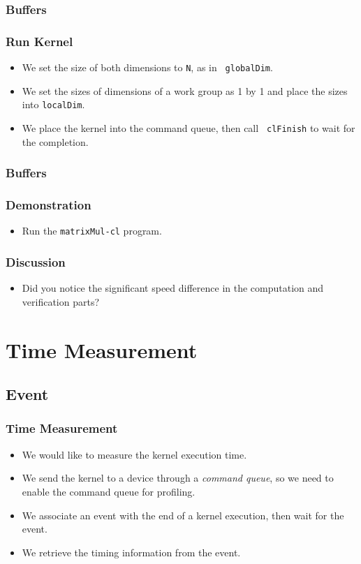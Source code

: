 \documentclass{beamer}
\begin{document}
\begin{frame}
  \frametitle{Buffers}
\end{frame}

\begin{frame}
  \frametitle{Run Kernel}
  \begin{itemize}
  \item We set the size of both dimensions to {\tt N}, as in {\tt
    globalDim}.
  \item We set the sizes of dimensions of a work group as 1 by 1 and
    place the sizes into {\tt localDim}.
  \item We place the kernel into the command queue, then call {\tt
    clFinish} to wait for the completion.
  \end{itemize}
\end{frame}

\begin{frame}
  \frametitle{Buffers}
\end{frame}



\begin{frame}
  \frametitle{Demonstration}
  \begin{itemize}
    \item Run the {\tt matrixMul-cl} program.
  \end{itemize}
\end{frame}

\begin{frame}
  \frametitle{Discussion}
  \begin{itemize}
  \item Did you notice the significant speed difference in the
    computation and verification parts?
  \end{itemize}
\end{frame}

\section{Time Measurement}

\subsection{Event}

\begin{frame}
  \frametitle{Time Measurement}
  \begin{itemize}
    \item We would like to measure the kernel execution time.
    \item We send the kernel to a device through a {\em command
      queue}, so we need to enable the command queue for profiling.
    \item We associate an event with the end of a kernel execution,
      then wait for the event.
    \item We retrieve the timing information from the event.
  \end{itemize}
\end{frame}
\end{document}

